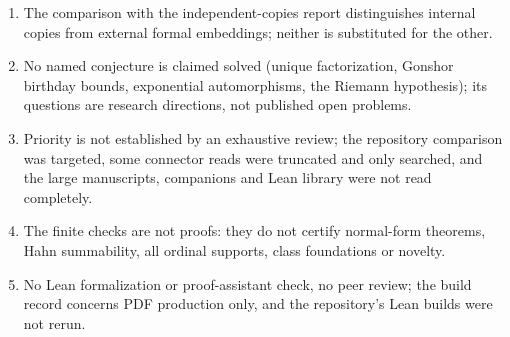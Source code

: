 \documentclass[11pt,oneside]{article}
\numberwithin{equation}{section}
\theoremstyle{definition}
\theoremstyle{remark}
\begin{document}
\begin{enumerate}[itemsep=1pt]
\item The comparison with the independent-copies report distinguishes internal copies from external formal embeddings; neither is
substituted for the other.
\item No named conjecture is claimed solved (unique factorization, Gonshor birthday bounds, exponential automorphisms, the Riemann
hypothesis); its questions are research directions, not published open problems.
\item Priority is not established by an exhaustive review; the repository comparison was targeted, some connector reads were truncated
and only searched, and the large manuscripts, companions and Lean library were not read completely.
\item The finite checks are not proofs: they do not certify normal-form theorems, Hahn summability, all ordinal supports, class
foundations or novelty.
\item No Lean formalization or proof-assistant check, no peer review; the build record concerns PDF production only, and the
repository's Lean builds were not rerun.
\end{enumerate}
\end{document}
